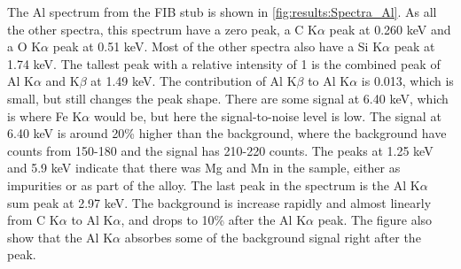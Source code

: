 The Al spectrum from the FIB stub is shown in \cref{fig:results:Spectra_Al}.
As all the other spectra, this spectrum have a zero peak, a C K$\alpha$ peak at 0.260 keV and a O K$\alpha$ peak at 0.51 keV.
Most of the other spectra also have a Si K$\alpha$ peak at 1.74 keV.
The tallest peak with a relative intensity of 1 is the combined peak of Al K$\alpha$ and K$\beta$ at 1.49 keV.
The contribution of Al K$\beta$ to Al K$\alpha$ is 0.013, which is small, but still changes the peak shape.
There are some signal at 6.40 keV, which is where Fe K$\alpha$ would be, but here the signal-to-noise level is low.
The signal at 6.40 keV is around 20\% higher than the background, where the background have counts from 150-180 and the signal has 210-220 counts.
The peaks at 1.25 keV and 5.9 keV indicate that there was Mg and Mn in the sample, either as impurities or as part of the alloy.
The last peak in the spectrum is the Al K$\alpha$ sum peak at 2.97 keV. %
The background is increase rapidly and almost linearly from C K$\alpha$ to Al K$\alpha$, and drops to 10\% after the Al K$\alpha$ peak.
The figure also show that the Al K$\alpha$ absorbes some of the background signal right after the peak.


%
%
%
%
%
%




